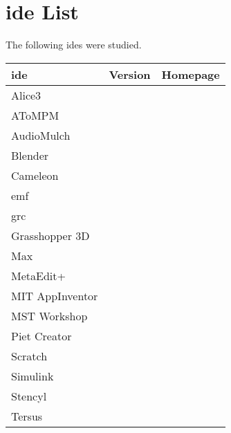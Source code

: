 \section{\acs{ide} List}
\label{sec:ide_list}

The following \acp{ide} were studied.

\begin{tabularx}{\textwidth}{@{}llX@{}}
  \textbf{\ac{ide}} & \textbf{Version} & \textbf{Homepage} \\
  \hline
  Alice3 \\ %
  AToMPM \\ %
  AudioMulch \\ %
  Blender \\ %
  Cameleon \\ %
  \ac{emf} \\ %
  \ac{grc} \\ %
  Grasshopper 3D \\ %
  Max \\ %
  MetaEdit+ \\ %
  MIT AppInventor \\ %
  MST Workshop \\ %
  Piet Creator \\ %
  Scratch \\ %
  Simulink \\ %
  Stencyl \\ %
  Tersus \\ %

\end{tabularx}
